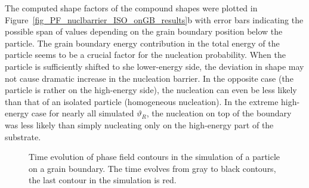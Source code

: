 The computed shape factors of the compound shapes were plotted in Figure~\ref{fig_PF_nuclbarrier_ISO_onGB_results}b with error bars indicating the possible span of values depending on the grain boundary position below the particle. The grain boundary energy contribution in the total energy of the particle seems to be a crucial factor for the nucleation probability. When the particle is sufficiently shifted to she lower-energy side, the deviation in shape may not cause dramatic increase in the nucleation barrier. In the opposite case (the particle is rather on the high-energy side), the nucleation can even be less likely than that of an isolated particle (homogeneous nucleation). In the extreme high-energy case for nearly all simulated $\vartheta_R$, the nucleation on top of the boundary was less likely than simply nucleating only on the high-energy part of the substrate. 

\begin{figure}
	\centering
	\caption{Time evolution of phase field contours in the simulation of a particle on a grain boundary. The time evolves from gray to black contours, the last contour in the simulation is red.}
	\label{fig_PF_nuclbarrier_ISO_onGB_contours}
\end{figure}

